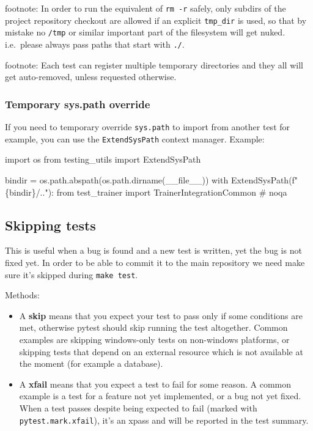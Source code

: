 \documentclass[
]{report}
\newenvironment{Shaded}{\begin{snugshade}}{\end{snugshade}}
\newcommand{\CommentTok}[1]{\textcolor[rgb]{0.37,0.37,0.37}{#1}}
\newcommand{\ControlFlowTok}[1]{\textcolor[rgb]{0.00,0.23,0.31}{#1}}
\newcommand{\ImportTok}[1]{\textcolor[rgb]{0.00,0.46,0.62}{#1}}
\newcommand{\NormalTok}[1]{\textcolor[rgb]{0.00,0.23,0.31}{#1}}
\newcommand{\OperatorTok}[1]{\textcolor[rgb]{0.37,0.37,0.37}{#1}}
\newcommand{\SpecialCharTok}[1]{\textcolor[rgb]{0.37,0.37,0.37}{#1}}
\newcommand{\SpecialStringTok}[1]{\textcolor[rgb]{0.13,0.47,0.30}{#1}}
\newcommand{\VariableTok}[1]{\textcolor[rgb]{0.07,0.07,0.07}{#1}}
\begin{document}
footnote: In order to run the equivalent of \texttt{rm\ -r} safely, only
subdirs of the project repository checkout are allowed if an explicit
\texttt{tmp\_dir} is used, so that by mistake no \texttt{/tmp} or
similar important part of the filesystem will get nuked. i.e.~please
always pass paths that start with \texttt{./}.

footnote: Each test can register multiple temporary directories and they
all will get auto-removed, unless requested otherwise.

\subsubsection{Temporary sys.path
override}\label{temporary-sys.path-override}

If you need to temporary override \texttt{sys.path} to import from
another test for example, you can use the \texttt{ExtendSysPath} context
manager. Example:

\begin{Shaded}
\begin{Highlighting}[]
\ImportTok{import}\NormalTok{ os}
\ImportTok{from}\NormalTok{ testing\_utils }\ImportTok{import}\NormalTok{ ExtendSysPath}

\NormalTok{bindir }\OperatorTok{=}\NormalTok{ os.path.abspath(os.path.dirname(}\VariableTok{\_\_file\_\_}\NormalTok{))}
\ControlFlowTok{with}\NormalTok{ ExtendSysPath(}\SpecialStringTok{f"}\SpecialCharTok{\{}\NormalTok{bindir}\SpecialCharTok{\}}\SpecialStringTok{/.."}\NormalTok{):}
    \ImportTok{from}\NormalTok{ test\_trainer }\ImportTok{import}\NormalTok{ TrainerIntegrationCommon  }\CommentTok{\# noqa}
\end{Highlighting}
\end{Shaded}

\subsection{Skipping tests}\label{skipping-tests}

This is useful when a bug is found and a new test is written, yet the
bug is not fixed yet. In order to be able to commit it to the main
repository we need make sure it's skipped during \texttt{make\ test}.

Methods:

\begin{itemize}
\item
  A \textbf{skip} means that you expect your test to pass only if some
  conditions are met, otherwise pytest should skip running the test
  altogether. Common examples are skipping windows-only tests on
  non-windows platforms, or skipping tests that depend on an external
  resource which is not available at the moment (for example a
  database).
\item
  A \textbf{xfail} means that you expect a test to fail for some reason.
  A common example is a test for a feature not yet implemented, or a bug
  not yet fixed. When a test passes despite being expected to fail
  (marked with \texttt{pytest.mark.xfail}), it's an xpass and will be
  reported in the test summary.
\end{itemize}
\end{document}
